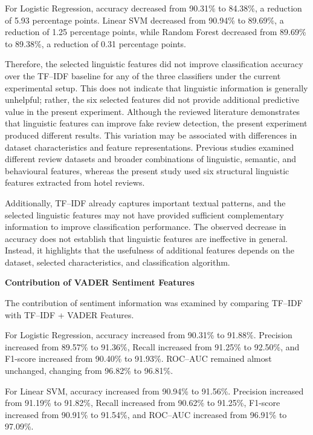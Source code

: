 \documentclass[12pt,a4paper]{report}
\begin{document}
For Logistic Regression, accuracy decreased from 90.31\% to 84.38\%,
a reduction of 5.93 percentage points. Linear SVM decreased from
90.94\% to 89.69\%, a reduction of 1.25 percentage points, while
Random Forest decreased from 89.69\% to 89.38\%, a reduction of
0.31 percentage points.

Therefore, the selected linguistic features did not improve
classification accuracy over the TF--IDF baseline for any of the
three classifiers under the current experimental setup. This does not
indicate that linguistic information is generally unhelpful; rather,
the six selected features did not provide additional predictive value
in the present experiment.
Although the reviewed literature demonstrates that linguistic
features can improve fake review detection, the present
experiment produced different results. This variation may
be associated with differences in dataset characteristics
and feature representations. Previous studies examined
different review datasets and broader combinations of
linguistic, semantic, and behavioural features, whereas
the present study used six structural linguistic features
extracted from hotel reviews.

Additionally, TF--IDF already captures important textual
patterns, and the selected linguistic features may not
have provided sufficient complementary information to
improve classification performance. The observed decrease
in accuracy does not establish that linguistic features
are ineffective in general. Instead, it highlights that
the usefulness of additional features depends on the
dataset, selected characteristics, and classification
algorithm.

\vspace{0.3cm}
\noindent\textbf{Contribution of VADER Sentiment Features}

The contribution of sentiment information was examined by comparing
TF--IDF with TF--IDF + VADER Features.

For Logistic Regression, accuracy increased from 90.31\% to 91.88\%.
Precision increased from 89.57\% to 91.36\%, Recall increased from
91.25\% to 92.50\%, and F1-score increased from 90.40\% to 91.93\%.
ROC--AUC remained almost unchanged, changing from 96.82\% to 96.81\%.

For Linear SVM, accuracy increased from 90.94\% to 91.56\%.
Precision increased from 91.19\% to 91.82\%, Recall increased from
90.62\% to 91.25\%, F1-score increased from 90.91\% to 91.54\%, and
ROC--AUC increased from 96.91\% to 97.09\%.
\end{document}
